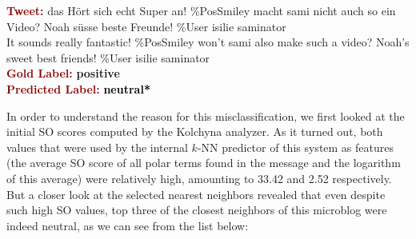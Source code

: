 \begin{example}\label{snt:cgsa:exmp:kolchyna-error-0}
  \noindent\textup{\bfseries\textcolor{darkred}{Tweet:}} {\upshape das
    H\"ort sich echt Super an! \%PosSmiley macht sami nicht auch so
    ein Video? Noah s\"usse beste Freunde! \heart{} \%User isilie
    saminator}\\
  \noindent It sounds really fantastic! \%PosSmiley won't sami also
  make such a video? Noah's sweet best friends! \heart{} \%User isilie
  saminator\\[0.65em]
  \noindent\textup{\bfseries\textcolor{darkred}{Gold Label:}}\hspace*{4.3em}\textbf{%
    \upshape\textcolor{green3}{positive}}\\
 \noindent\textup{\bfseries\textcolor{darkred}{Predicted Label:}}\hspace*{2em}\textbf{%
    \upshape\textcolor{black}{neutral*}}\\
\end{example}

\noindent In order to understand the reason for this
misclassification, we first looked at the initial SO scores computed
by the Kolchyna analyzer.  As it turned out, both values that were
used by the internal $k$-NN predictor of this system as features (the
average SO score of all polar terms found in the message and the
logarithm of this average) were relatively high, amounting to 33.42
and 2.52 respectively.  But a closer look at the selected nearest
neighbors revealed that even despite such high SO values, top three of
the closest neighbors of this microblog were indeed neutral, as we can
see from the list below:

